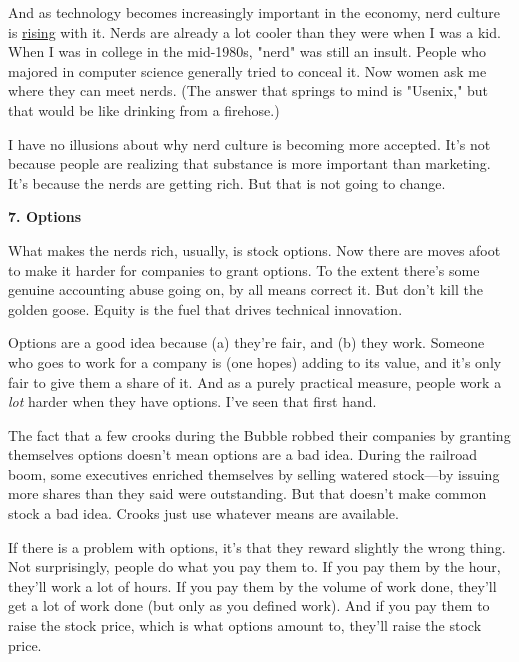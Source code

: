 And as technology becomes increasingly
                  important in the economy, nerd culture is
                  \href{http://www.paulgraham.com/nerdad.html}{rising} with it. Nerds are already a
                  lot cooler than they were when I was a kid. When I was in
                  college in the mid-1980s, "nerd" was still an insult. People
                  who majored in computer science generally tried to conceal it.
                  Now women ask me where they can meet nerds. (The answer that
                  springs to mind is "Usenix," but that would be like drinking
                  from a firehose.)

I have no illusions about why
                  nerd culture is becoming more accepted. It's not because
                  people are realizing that substance is more important than
                  marketing. It's because the nerds are getting rich. But that
                  is not going to change.

\textbf{7. Options}

What makes the nerds rich, usually, is stock
                  options. Now there are moves afoot to make it harder for
                  companies to grant options. To the extent there's some genuine
                  accounting abuse going on, by all means correct it. But don't
                  kill the golden goose. Equity is the fuel that drives
                  technical innovation.

Options are a good idea
                  because (a) they're fair, and (b) they work. Someone who goes
                  to work for a company is (one hopes) adding to its value, and
                  it's only fair to give them a share of it. And as a purely
                  practical measure, people work a \emph{lot} harder when they
                  have options. I've seen that first hand.

The fact
                  that a few crooks during the Bubble robbed their companies by
                  granting themselves options doesn't mean options are a bad
                  idea. During the railroad boom, some executives enriched
                  themselves by selling watered stock---by issuing more
                  shares than they said were outstanding. But that doesn't make
                  common stock a bad idea. Crooks just use whatever means are
                  available.

If there is a problem with options, it's
                  that they reward slightly the wrong thing. Not surprisingly,
                  people do what you pay them to. If you pay them by the hour,
                  they'll work a lot of hours. If you pay them by the volume of
                  work done, they'll get a lot of work done (but only as you
                  defined work). And if you pay them to raise the stock price,
                  which is what options amount to, they'll raise the stock
                  price.

